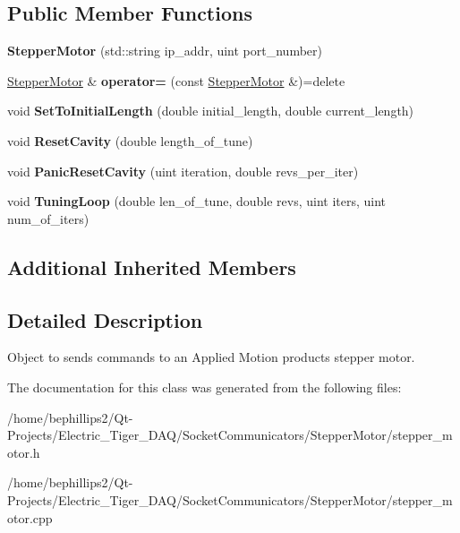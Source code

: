 \subsection*{Public Member Functions}
\begin{DoxyCompactItemize}
\item 
{\bfseries Stepper\+Motor} (std\+::string ip\+\_\+addr, uint port\+\_\+number)\hypertarget{class_stepper_motor_a60b5baede3214f0774dd4fe166ab6bd5}{}\label{class_stepper_motor_a60b5baede3214f0774dd4fe166ab6bd5}

\item 
\hyperlink{class_stepper_motor}{Stepper\+Motor} \& {\bfseries operator=} (const \hyperlink{class_stepper_motor}{Stepper\+Motor} \&)=delete\hypertarget{class_stepper_motor_aeeceb8eefbcffef0cb0c2b742ffe3603}{}\label{class_stepper_motor_aeeceb8eefbcffef0cb0c2b742ffe3603}

\item 
void {\bfseries Set\+To\+Initial\+Length} (double initial\+\_\+length, double current\+\_\+length)\hypertarget{class_stepper_motor_aa3782b6fa0a79f6e30c1547b23e62a76}{}\label{class_stepper_motor_aa3782b6fa0a79f6e30c1547b23e62a76}

\item 
void {\bfseries Reset\+Cavity} (double length\+\_\+of\+\_\+tune)\hypertarget{class_stepper_motor_a3fb36356f54f20d9e5f5b4d0e56c41d9}{}\label{class_stepper_motor_a3fb36356f54f20d9e5f5b4d0e56c41d9}

\item 
void {\bfseries Panic\+Reset\+Cavity} (uint iteration, double revs\+\_\+per\+\_\+iter)\hypertarget{class_stepper_motor_a260af15a346488150de82fa3801df94c}{}\label{class_stepper_motor_a260af15a346488150de82fa3801df94c}

\item 
void {\bfseries Tuning\+Loop} (double len\+\_\+of\+\_\+tune, double revs, uint iters, uint num\+\_\+of\+\_\+iters)\hypertarget{class_stepper_motor_a299c95250f7b1cbbf1928e05fdfb0c6c}{}\label{class_stepper_motor_a299c95250f7b1cbbf1928e05fdfb0c6c}

\end{DoxyCompactItemize}
\subsection*{Additional Inherited Members}


\subsection{Detailed Description}
Object to sends commands to an Applied Motion products stepper motor. 

The documentation for this class was generated from the following files\+:\begin{DoxyCompactItemize}
\item 
/home/bephillips2/\+Qt-\/\+Projects/\+Electric\+\_\+\+Tiger\+\_\+\+D\+A\+Q/\+Socket\+Communicators/\+Stepper\+Motor/stepper\+\_\+motor.\+h\item 
/home/bephillips2/\+Qt-\/\+Projects/\+Electric\+\_\+\+Tiger\+\_\+\+D\+A\+Q/\+Socket\+Communicators/\+Stepper\+Motor/stepper\+\_\+motor.\+cpp\end{DoxyCompactItemize}
